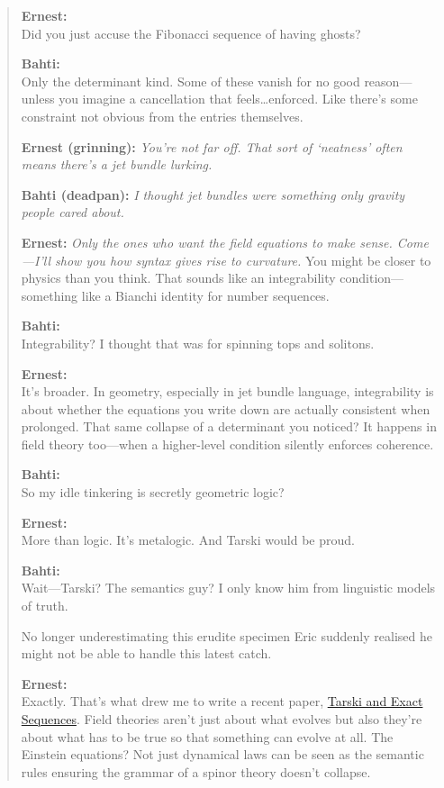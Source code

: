 \begin{quote}
\textbf{Ernest:}  \\
Did you just accuse the Fibonacci sequence of having ghosts?

\textbf{Bahti:}  \\
Only the determinant kind. Some of these vanish for no good reason---unless you imagine a cancellation that feels\dots enforced. Like there's some constraint not obvious from the entries themselves.


\medskip

\noindent
\textbf{Ernest (grinning):} \textit{You're not far off. That sort of ‘neatness’ often means there's a jet bundle lurking.}

\textbf{Bahti (deadpan):} \textit{I thought jet bundles were something only gravity people cared about.}

\textbf{Ernest:} \textit{Only the ones who want the field equations to make sense. Come—I'll show you how syntax gives rise to curvature.} You might be closer to physics than you think. That sounds like an integrability condition---something like a Bianchi identity for number sequences.

\textbf{Bahti:}  \\
Integrability? I thought that was for spinning tops and solitons.

\textbf{Ernest:}  \\
It's broader. In geometry, especially in jet bundle language, integrability is about whether the equations you write down are actually consistent when prolonged. That same collapse of a determinant you noticed? It happens in field theory too---when a higher-level condition silently enforces coherence.

\textbf{Bahti:}  \\
So my idle tinkering is secretly geometric logic?

\textbf{Ernest:}  \\
More than logic. It's metalogic. And Tarski would be proud.

\textbf{Bahti:}  \\
Wait---Tarski? The semantics guy? I only know him from linguistic models of truth.

No longer underestimating this erudite specimen Eric suddenly realised he might not be able to handle this latest catch.

\textbf{Ernest:}  \\
Exactly. That\textquoteright s what drew me to write a recent paper, \href{https://www.researchgate.net/publication/392402161_From_Spinor_Dynamics_to_Gravitational_Constraint_A_Tarskian_Interpretation_of_the_Einstein_Equations}{Tarski and Exact Sequences}. Field theories aren't just about what evolves but also they're about what has to be true so that something can evolve at all. The Einstein equations? Not just dynamical laws can be seen as the semantic rules ensuring the grammar of a spinor theory doesn't collapse.


\end{quote}
